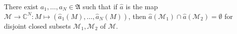 
There exist $a_1, \ldots, a_N \in \mathfrak{A}$ such that if $\hat{a}$ is the map $\mathcal{M} \to \mathbb{C}^N : M \mapsto (\hat{a}_1(M), \ldots, \hat{a}_N(M))$, then $\hat{a}(\mathcal{M}_1) \cap \hat{a}(\mathcal{M}_2) = \emptyset$ for disjoint closed subsets $\mathcal{M}_1, \mathcal{M}_2$ of $\mathcal{M}$.
